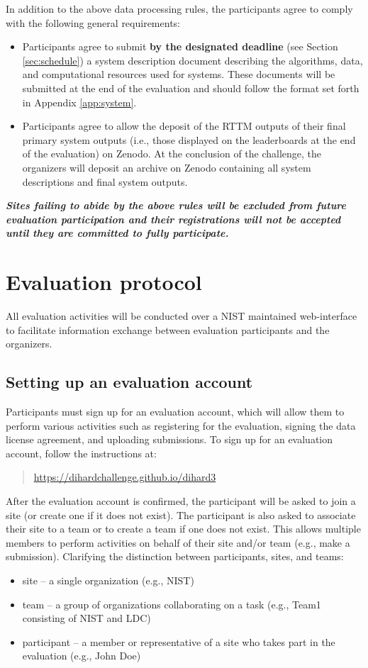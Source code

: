 \documentclass{article}
\begin{document}
In addition to the above data processing rules, the participants agree to comply with the following general requirements:
\begin{itemize}
    \item Participants agree to submit {\bf by the designated deadline} (see Section \ref{sec:schedule}) a system description document describing the algorithms, data, and computational resources used for systems. These documents will be submitted at the end of the evaluation and should follow the format set forth in Appendix \ref{app:system}.
    \item Participants agree to allow the deposit of the RTTM outputs of their final primary system outputs (i.e., those displayed on the leaderboards at the end of the evaluation) on Zenodo. At the conclusion of the challenge, the organizers will deposit an archive on Zenodo containing all system descriptions and final system outputs.
\end{itemize}
\vspace{0.25cm}
\emph{\textbf{Sites failing to abide by the above rules will be excluded from future evaluation participation and their registrations will not be accepted until they are committed to fully participate.}}


\section{Evaluation protocol}
All evaluation activities will be conducted over a NIST maintained web-interface to facilitate information exchange between evaluation participants and the organizers.


\subsection{Setting up an evaluation account}
Participants must sign up for an evaluation account, which will allow them to perform various activities such as registering for the evaluation, signing the data license agreement, and uploading submissions. To sign up for an evaluation account, follow the instructions at: 
    \begin{quote}
        \url{https://dihardchallenge.github.io/dihard3}
    \end{quote}
After the evaluation account is confirmed, the participant will be asked to join a site (or create one if it does not exist). The participant is also asked to associate their site to a team or to create a team if one does not exist. This allows multiple members to perform activities on behalf of their site and/or team (e.g., make a submission). Clarifying the distinction between participants, sites, and teams:
    \begin{itemize}
        \item site  --   a single organization (e.g., NIST)
        \item team  --  a group of organizations collaborating on a task (e.g., Team1 consisting of NIST and LDC)
        \item participant  --  a member or representative of a site who takes part in the evaluation (e.g., John Doe)
    \end{itemize}
\end{document}
